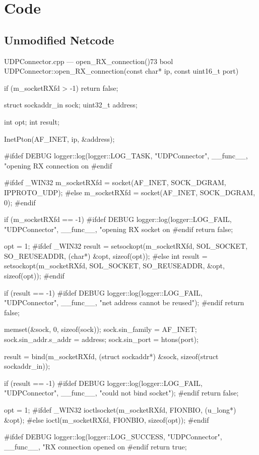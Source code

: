 \chapter{Code}\label{ax:code}

\section{Unmodified Netcode}\label{ax:code:netcode}

\begin{codelist}{UDPConnector.cpp --- open\_RX\_connection()}{73}
bool UDPConnector::open_RX_connection(const char* ip, const uint16_t port) {
    if (m_socketRXfd > -1)
        return false;

    struct sockaddr_in sock;
    uint32_t address;

    int opt;
    int result;

    InetPton(AF_INET, ip, &address);

#ifdef DEBUG
    logger::log(logger::LOG_TASK, "UDPConnector", __func__, "opening RX connection on %
#endif

#ifdef _WIN32
    m_socketRXfd = socket(AF_INET, SOCK_DGRAM, IPPROTO_UDP);
#else
    m_socketRXfd = socket(AF_INET, SOCK_DGRAM, 0);
#endif

    if (m_socketRXfd == -1) {
#ifdef DEBUG
        logger::log(logger::LOG_FAIL, "UDPConnector", __func__, "opening RX socket on %
#endif
        return false;
    }

    opt = 1;
#ifdef _WIN32
    result = setsockopt(m_socketRXfd, SOL_SOCKET, SO_REUSEADDR, (char*) &opt, sizeof(opt));
#else
    int result   = setsockopt(m_socketRXfd, SOL_SOCKET, SO_REUSEADDR, &opt, sizeof(opt));
#endif

    if (result == -1) {
#ifdef DEBUG
        logger::log(logger::LOG_FAIL, "UDPConnector", __func__, "net address cannot be reused");
#endif
        return false;
    }

    memset(&sock, 0, sizeof(sock));
    sock.sin_family      = AF_INET;
    sock.sin_addr.s_addr = address;
    sock.sin_port        = htons(port);

    result = bind(m_socketRXfd, (struct sockaddr*) &sock, sizeof(struct sockaddr_in));

    if (result == -1) {
#ifdef DEBUG
        logger::log(logger::LOG_FAIL, "UDPConnector", __func__, "could not bind socket");
#endif
        return false;
    }

    opt = 1;
#ifdef _WIN32
    ioctlsocket(m_socketRXfd, FIONBIO, (u_long*) &opt);
#else
    ioctl(m_socketRXfd, FIONBIO, sizeof(opt));
#endif

#ifdef DEBUG
    logger::log(logger::LOG_SUCCESS, "UDPConnector", __func__, "RX connection opened on %
#endif
    return true;
}
\end{codelist}

